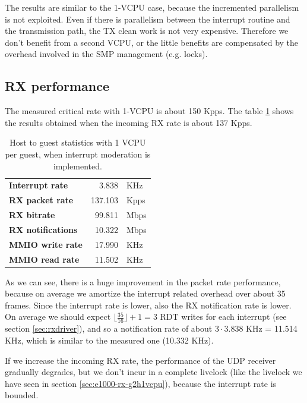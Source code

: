 The results are similar to the 1-VCPU case, because the incremented parallelism is not exploited. Even if there is parallelism
between the interrupt routine and the transmission path, the TX clean work is not very expensive. Therefore we don't benefit from a second 
VCPU, or the little benefits are compensated by the overhead involved in the SMP management (e.g. locks).


\subsection{RX performance}
The measured critical rate with 1-VCPU is about 150 Kpps.
The table \ref{tab:e1000-mit-rx-g2h1vcpu} shows the results obtained when the incoming RX rate is about 137 Kpps.

\begin{table}
\begin{center}
\begin{tabular}{lrl}
\toprule
\textbf{Interrupt rate} & 3.838 & KHz\\
\textbf{RX packet rate} & 137.103 & Kpps\\
\textbf{RX bitrate} & 99.811 & Mbps\\
\textbf{RX notifications} & 10.322 & Mbps\\
\textbf{MMIO write rate} & 17.990 & KHz\\
\textbf{MMIO read rate} & 11.502 & KHz\\
\bottomrule
\end{tabular}
\end{center}
\caption{Host to guest statistics with 1 VCPU per guest, when interrupt moderation is implemented.}
\label{tab:e1000-mit-rx-g2h1vcpu}
\end{table}

As we can see, there is a huge improvement in the packet rate performance, because on average we amortize the interrupt related overhead
over about 35 frames. Since the interrupt rate is lower, also the RX notification rate is lower. On average we should expect 
$\lfloor \frac{35}{16} \rfloor + 1 = 3$ RDT writes for each interrupt (see section \ref{sec:rxdriver}), and so a notification rate of 
about $3 \cdot 3.838$ KHz = 11.514 KHz, which is similar to the measured one (10.332 KHz).

If we increase the incoming RX rate, the performance of the UDP receiver gradually degrades, but we don't incur in a complete livelock 
(like the livelock we have seen in section \ref{sec:e1000-rx-g2h1vcpu}), because the interrupt rate is bounded.

